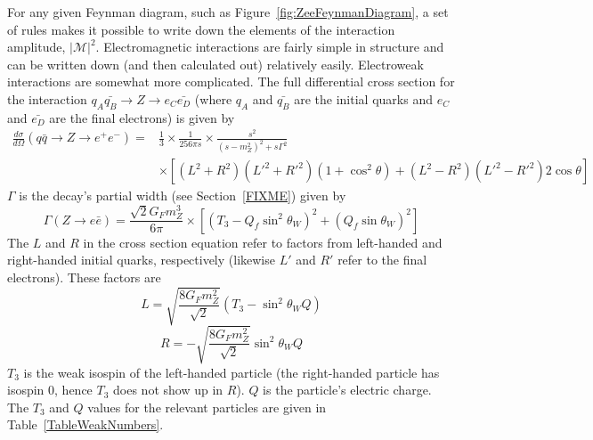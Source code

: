 For any given Feynman diagram, 
such as Figure~\ref{fig:ZeeFeynmanDiagram}, 
a set of rules makes it possible to write 
down the elements of the interaction amplitude, 
$\left| \mathcal{M} \right| ^2$.  
Electromagnetic interactions are fairly 
simple in structure and can be written down 
(and then calculated out) relatively easily.  
Electroweak interactions are somewhat 
more complicated.  
The full differential cross section for the interaction 
$ q_A \bar{q_B} \rightarrow Z \rightarrow e_{C} \bar{e_{D}} $
(where $q_A$ and $\bar{q_B}$ are the initial quarks 
and $e_{C}$ and $\bar{e_{D}}$ are the final electrons) is given by 
\begin{align*}
\frac{d \sigma}{d \Omega} 
( q \bar{q} \rightarrow Z \rightarrow e^+ e^- ) 
= &\frac{1}{3} 
\times \frac{1}{256 \pi s} 
\times \frac{s^2}{(s - m_Z^2)^2 + s \Gamma^2} \\
&\times \left[(L^2 + R^2) (L'^2 + R'^2) (1 + \cos^2 \theta)
+ (L^2 - R^2) (L'^2 - R'^2) 2 \cos \theta \right]
\end{align*}
$\Gamma$ is the \Zee decay's 
partial width (see Section~\ref{FIXME}) 
given by 
\[
\Gamma (Z \rightarrow e \bar{e} )
= \frac{ \sqrt{2} G_F m_Z^3 }{6 \pi}
\times \left[(T_3 - Q_f \sin^2 \theta_W )^2 
+ (Q_f \sin \theta_W )^2 \right]
\]
The $L$ and $R$ in the cross section equation 
refer to factors from %
left-handed and right-handed initial quarks, respectively 
(likewise $L'$ and $R'$ refer to the final electrons).  
These factors are 
\[
L = \sqrt{ \frac{8 G_F m_Z^2}{\sqrt{2} } }(T_3 - \sin^2 \theta_W Q)
\]
\[
R = - \sqrt{ \frac{8 G_F m_Z^2}{\sqrt{2} } } \sin^2 \theta_W Q
\]
$T_3$ is the weak isospin of the left-handed particle 
(the right-handed particle has isospin 0, 
hence $T_3$ does not show up in $R$). 
$Q$ is the particle's electric charge.  
The $T_3$ and $Q$ values for the relevant particles are 
given in Table~\ref{TableWeakNumbers}.  

